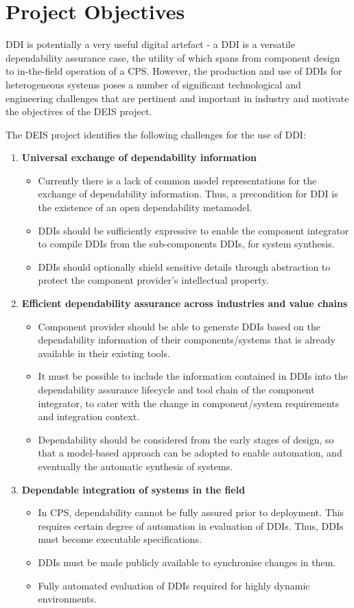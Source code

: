 \section{Project Objectives}
DDI is potentially a very useful digital artefact - a DDI is a versatile dependability assurance case, the utility of which spans from component design to in-the-field operation of a CPS. However, the production and use of DDIs for heterogeneous systems poses a number of significant technological and engineering challenges that are pertinent and important in industry and motivate the objectives of the DEIS project. 

The DEIS project identifies the following challenges for the use of DDI:

\begin{enumerate}
	\item \textbf{Universal exchange of dependability information}
		\begin{itemize}
			\item Currently there is a lack of common model representations for the exchange of dependability information. Thus, a precondition for DDI is the existence of an open dependability metamodel. 
			\item DDIs should be sufficiently expressive to enable the component integrator to compile DDIs from the sub-components DDIs, for system synthesis.
			\item DDIs should optionally shield sensitive details through abstraction to protect the component provider's intellectual property. 
		\end{itemize}
	\item \textbf{Efficient dependability assurance across industries and value chains}
		\begin{itemize}
			\item Component provider should be able to generate DDIs based on the dependability information of their components/systems that is already available in their existing tools.
			\item It must be possible to include the information contained in DDIs into the dependability assurance lifecycle and tool chain of the component integrator, to cater with the change in component/system requirements and integration context.
			\item Dependability should be considered from the early stages of design, so that a model-based approach can be adopted to enable automation, and eventually the automatic synthesis of systems.
		\end{itemize}
	\item \textbf{Dependable integration of systems in the field}
		\begin{itemize}
			\item In CPS, dependability cannot be fully assured prior to deployment. This requires certain degree of automation in evaluation of DDIs. Thus, DDIs must become executable specifications.
			\item DDIs must be made publicly available to synchronise changes in them.
			\item Fully automated evaluation of DDIs required for highly dynamic environments.
		\end{itemize}
\end{enumerate}

